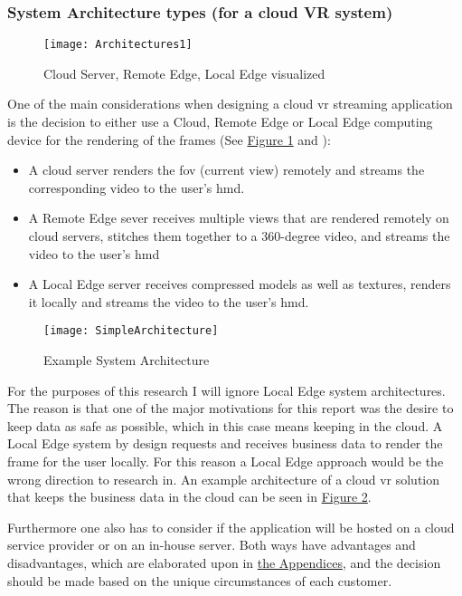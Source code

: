 \subsubsection{System Architecture types (for a cloud VR system)}
\begin{figure}[h]
\caption{Cloud Server, Remote Edge, Local Edge visualized \parencite{wlanvr}}
\label{fig:arch1}
\texttt{[image: Architectures1]}
\end{figure}

One of the main considerations when designing a cloud \acrshort{vr} streaming application is the decision to either use a Cloud, Remote Edge or Local Edge computing device for the rendering of the frames (See \hyperref[fig:arch1]{Figure 1} and \cite{wlanvr}):
\begin{itemize}
\item A cloud server renders the \acrfull{fov} (current view) remotely and streams the corresponding video to the user’s \acrfull{hmd}. 
\item A Remote Edge sever receives multiple views that are rendered remotely on cloud servers, stitches them together to a 360-degree video, and streams the video to the user’s \acrshort{hmd}
\item A Local Edge server receives compressed models as well as textures, renders it locally and streams the video to the user’s \acrshort{hmd}.
\end{itemize} 

\begin{figure}[!htbp]
\caption{Example System Architecture}
\label{fig:sysarch}
\texttt{[image: SimpleArchitecture]}
\end{figure}

For the purposes of this research I will ignore Local Edge system architectures. The reason is that one of the major motivations for this report was the desire to keep data as safe as possible, which in this case means keeping in the cloud. A Local Edge system by design requests and receives business data to render the frame for the user locally. For this reason a Local Edge approach would be the wrong direction to research in. An example architecture of a cloud \acrshort{vr} solution that keeps the business data in the cloud can be seen in \hyperref[fig:sysarch]{Figure 2}.

Furthermore one also has to consider if the application will be hosted on a cloud service provider or on an in-house server. Both ways have advantages and disadvantages, which are elaborated upon in \hyperref[app:swot]{the Appendices}, and the decision should be made based on the unique circumstances of each customer.

